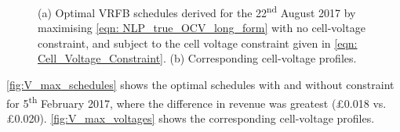 \documentclass[preprint,3p,review,authoryear,10pt]{elsarticle}
\begin{document}
\begin{figure}[!ht]
\centering
{}
\caption{(a) Optimal VRFB schedules derived for the 22\textsuperscript{nd} August 2017 by maximising \cref{eqn: NLP_true_OCV_long_form} with no cell-voltage constraint, and subject to the cell voltage constraint given in \cref{eqn: Cell_Voltage_Constraint}. (b) Corresponding cell-voltage profiles.}
\end{figure}


\cref{fig:V_max_schedules} shows the optimal schedules with and without constraint for 5\textsuperscript{th} February 2017, where the difference in revenue was greatest (\pounds 0.018 vs. \pounds 0.020). \cref{fig:V_max_voltages} shows the corresponding cell-voltage profiles.
\end{document}
